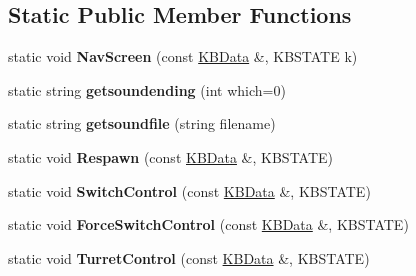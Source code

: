 \subsection*{Static Public Member Functions}
\begin{DoxyCompactItemize}
\item 
static void {\bfseries Nav\+Screen} (const \hyperlink{classKBData}{K\+B\+Data} \&, K\+B\+S\+T\+A\+TE k)\hypertarget{classGameCockpit_a87228f7b35ea265058491157a236f7cc}{}\label{classGameCockpit_a87228f7b35ea265058491157a236f7cc}

\item 
static string {\bfseries getsoundending} (int which=0)\hypertarget{classGameCockpit_aa7d7c70c2508ff47a991e0c5854a04ea}{}\label{classGameCockpit_aa7d7c70c2508ff47a991e0c5854a04ea}

\item 
static string {\bfseries getsoundfile} (string filename)\hypertarget{classGameCockpit_a13b505fbc8e54965c0d4117cecdfafa9}{}\label{classGameCockpit_a13b505fbc8e54965c0d4117cecdfafa9}

\item 
static void {\bfseries Respawn} (const \hyperlink{classKBData}{K\+B\+Data} \&, K\+B\+S\+T\+A\+TE)\hypertarget{classGameCockpit_a883d6f019317f4702346f88ab687f2ff}{}\label{classGameCockpit_a883d6f019317f4702346f88ab687f2ff}

\item 
static void {\bfseries Switch\+Control} (const \hyperlink{classKBData}{K\+B\+Data} \&, K\+B\+S\+T\+A\+TE)\hypertarget{classGameCockpit_abdabfbcb31ab5bc091778b23ce033da6}{}\label{classGameCockpit_abdabfbcb31ab5bc091778b23ce033da6}

\item 
static void {\bfseries Force\+Switch\+Control} (const \hyperlink{classKBData}{K\+B\+Data} \&, K\+B\+S\+T\+A\+TE)\hypertarget{classGameCockpit_ace03f8a4b0585deb8a115dd4914e1636}{}\label{classGameCockpit_ace03f8a4b0585deb8a115dd4914e1636}

\item 
static void {\bfseries Turret\+Control} (const \hyperlink{classKBData}{K\+B\+Data} \&, K\+B\+S\+T\+A\+TE)\hypertarget{classGameCockpit_aab8924519fe2c2429b470a89469d9cdc}{}\label{classGameCockpit_aab8924519fe2c2429b470a89469d9cdc}

\end{DoxyCompactItemize}
